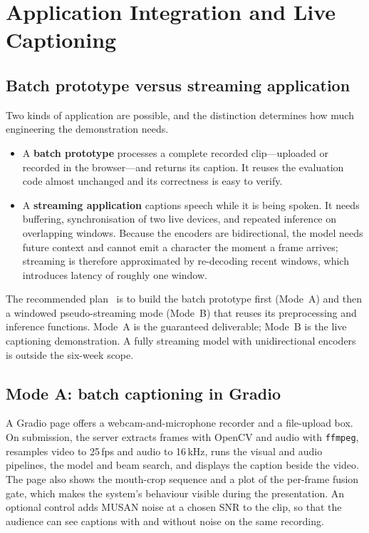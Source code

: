 \section{Application Integration and Live Captioning}
\label{sec:application}

\subsection{Batch prototype versus streaming application}
Two kinds of application are possible, and the distinction determines how much
engineering the demonstration needs.
\begin{itemize}
  \item A \textbf{batch prototype} processes a complete recorded clip---uploaded
        or recorded in the browser---and returns its caption. It reuses the
        evaluation code almost unchanged and its correctness is easy to verify.
  \item A \textbf{streaming application} captions speech while it is being spoken.
        It needs buffering, synchronisation of two live devices, and repeated
        inference on overlapping windows. Because the encoders are bidirectional,
        the model needs future context and cannot emit a character the moment a
        frame arrives; streaming is therefore approximated by re-decoding recent
        windows, which introduces latency of roughly one window.
\end{itemize}

The recommended plan \rec\ is to build the batch prototype first (Mode~A) and
then a windowed pseudo-streaming mode (Mode~B) that reuses its preprocessing and
inference functions. Mode~A is the guaranteed deliverable; Mode~B is the live
captioning demonstration. A fully streaming model with unidirectional encoders
is outside the six-week scope.

\subsection{Mode A: batch captioning in Gradio}
A Gradio page offers a webcam-and-microphone recorder and a file-upload box. On
submission, the server extracts frames with OpenCV and audio with
\texttt{ffmpeg}, resamples video to 25\,fps and audio to 16\,kHz, runs the visual
and audio pipelines, the model and beam search, and displays the caption beside
the video. The page also shows the mouth-crop sequence and a plot of the
per-frame fusion gate, which makes the system's behaviour visible during the
presentation. An optional control adds MUSAN noise at a chosen SNR to the clip,
so that the audience can see captions with and without noise on the same
recording.

